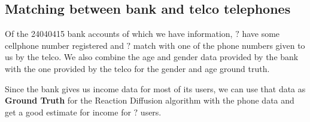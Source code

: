 \subsection{Matching between bank and telco telephones}

Of the \num{24040415} bank accounts of which we have information, \( ? \) have some cellphone number registered and \( ? \) match with one of the phone numbers given to us by the telco. We also combine the age and gender data provided by the bank with the one provided by the telco for the gender and age ground truth.

Since the bank gives us income data for most of its users, we can use that data as \textbf{Ground Truth} for the Reaction Diffusion algorithm with the phone data and get a good estimate for income for \( ? \) users.
